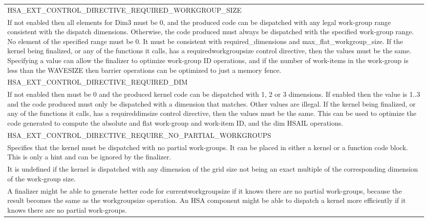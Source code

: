 \documentclass[final,oneside]{book}
\newcommand{\reftyp}[1]{#1}
\newcommand{\refenu}[1]{\reftyp{#1}}
\begin{document}
\begin{longtable}{@{\hspace{2em}}p{\linewidth-2em}}
\hspace{-2em}\refenu{HSA_\-EXT_\-CONTROL_\-DIRECTIVE_\-REQUIRED_\-WORKGROUP_\-SIZE}\\If not enabled then all elements for Dim3 must be 0, and the produced code can be dispatched with any legal work-group range consistent with the dispatch dimensions. Otherwise, the code produced must always be dispatched with the specified work-group range. No element of the specified range must be 0. It must be consistent with required_\-dimensions and max_\-flat_\-workgroup_\-size. If the kernel being finalized, or any of the functions it calls, has a requiredworkgroupsize control directive, then the values must be the same. Specifying a value can allow the finalizer to optimize work-group ID operations, and if the number of work-items in the work-group is less than the WAVESIZE then barrier operations can be optimized to just a memory fence.\\[2mm]
\hspace{-2em}\refenu{HSA_\-EXT_\-CONTROL_\-DIRECTIVE_\-REQUIRED_\-DIM}\\If not enabled then must be 0 and the produced kernel code can be dispatched with 1, 2 or 3 dimensions. If enabled then the value is 1..3 and the code produced must only be dispatched with a dimension that matches. Other values are illegal. If the kernel being finalized, or any of the functions it calls, has a requireddimsize control directive, then the values must be the same. This can be used to optimize the code generated to compute the absolute and flat work-group and work-item ID, and the dim HSAIL operations.\\[2mm]
\hspace{-2em}\refenu{HSA_\-EXT_\-CONTROL_\-DIRECTIVE_\-REQUIRE_\-NO_\-PARTIAL_\-WORKGROUPS}\\Specifies that the kernel must be dispatched with no partial work-groups. It can be placed in either a kernel or a function code block. This is only a hint and can be ignored by the finalizer.\\[2mm]
It is undefined if the kernel is dispatched with any dimension of the grid size not being an exact multiple of the corresponding dimension of the work-group size.\\[2mm]
A finalizer might be able to generate better code for currentworkgroupsize if it knows there are no partial work-groups, because the result becomes the same as the workgroupsize operation. An HSA component might be able to dispatch a kernel more efficiently if it knows there are no partial work-groups.\\[2mm]

\end{longtable}
\end{document}
